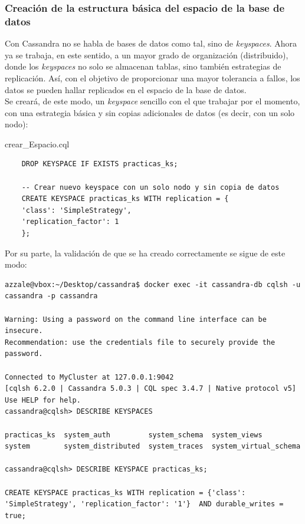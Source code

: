 \documentclass{article}
\begin{document}
\subsubsection{Creación de la estructura básica del espacio de la base de datos}

Con Cassandra no se habla de bases de datos como tal, sino de \textit{keyspaces}. Ahora ya se trabaja, en este sentido, a un mayor grado de organización (distribuido), donde los \textit{keyspaces} no solo se almacenan tablas, sino también estrategias de replicación. Así, con el objetivo de proporcionar una mayor tolerancia a fallos, los datos se pueden hallar replicados en el espacio de la base de datos.
\\
Se creará, de este modo, un \textit{keyspace} sencillo con el que trabajar por el momento, con una estrategia básica y sin copias adicionales de datos (es decir, con un solo nodo):

\begin{scriptbox}{crear\_Espacio.cql}
\begin{verbatim}
    DROP KEYSPACE IF EXISTS practicas_ks;

    -- Crear nuevo keyspace con un solo nodo y sin copia de datos
    CREATE KEYSPACE practicas_ks WITH replication = {
    'class': 'SimpleStrategy',
    'replication_factor': 1
    };
\end{verbatim}
\end{scriptbox}

Por su parte, la validación de que se ha creado correctamente se sigue de este modo:

\begin{tcolorbox}[colback=black, coltext=white, fontupper=\ttfamily, title=Terminal]
\begin{verbatim}
azzale@vbox:~/Desktop/cassandra$ docker exec -it cassandra-db cqlsh -u cassandra -p cassandra 

Warning: Using a password on the command line interface can be insecure.
Recommendation: use the credentials file to securely provide the password.

Connected to MyCluster at 127.0.0.1:9042
[cqlsh 6.2.0 | Cassandra 5.0.3 | CQL spec 3.4.7 | Native protocol v5]
Use HELP for help.
cassandra@cqlsh> DESCRIBE KEYSPACES

practicas_ks  system_auth         system_schema  system_views         
system        system_distributed  system_traces  system_virtual_schema

cassandra@cqlsh> DESCRIBE KEYSPACE practicas_ks;

CREATE KEYSPACE practicas_ks WITH replication = {'class': 'SimpleStrategy', 'replication_factor': '1'}  AND durable_writes = true;
\end{verbatim}
\end{tcolorbox}
\end{document}
